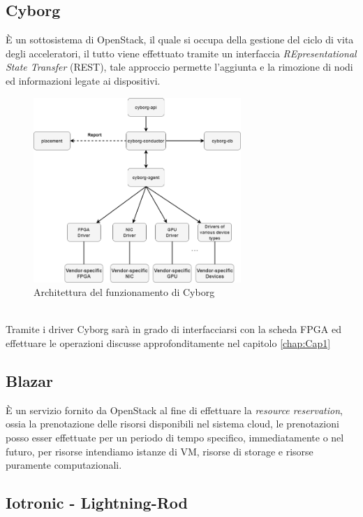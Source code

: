 \subsection{Cyborg}
È un sottosistema di OpenStack, il quale si occupa della gestione del ciclo di vita degli acceleratori, il tutto viene effettuato tramite un interfaccia \textit{REpresentational State Transfer} (REST), tale approccio permette l'aggiunta e la rimozione di nodi ed informazioni legate ai dispositivi.\cite{Cyborg}
\begin{figure}[h]
\centering
\includegraphics[width=0.7\textwidth]{images/cyborg-architecture.png}
\caption{Architettura del funzionamento di Cyborg\cite{Cyborg}}
\end{figure}\\
Tramite i driver Cyborg sarà in grado di interfacciarsi con la scheda FPGA ed effettuare le operazioni discusse approfonditamente nel capitolo \ref{chap:Cap1}
\subsection{Blazar}
È un servizio fornito da OpenStack al fine di effettuare la \textit{resource reservation}, ossia la prenotazione delle risorsi disponibili nel sistema cloud, le prenotazioni posso esser effettuate per un periodo di tempo specifico, immediatamente o nel futuro, per risorse intendiamo istanze di VM, risorse di storage e risorse puramente computazionali.\cite{Blazar}
\subsection{Iotronic - Lightning-Rod}
